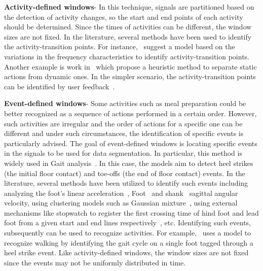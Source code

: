 \noindent\textbf{Activity-defined windows}- In this technique, signals are partitioned based on the detection of activity changes, so the start and end points of each activity should be determined. Since the times of activities can be different, the window sizes are not fixed. In the literature, several methods have been used to identify the activity-transition points. For instance,~\citep{sekine2000classification,nyan2006classification} suggest a model based on the variations in the frequency characteristics to identify activity-transition points.  Another example is work in~\citep{yoshizawa2013parameter} which propose a heuristic method to separate static actions from dynamic ones. In the simpler scenario, the activity-transition points can be identified by user feedback~\citep{lester2006practical,he2009activity,figo2010preprocessing,dernbach2012simple}. 

\noindent\textbf{Event-defined windows}- Some activities such as meal preparation could be better recognized as a sequence of actions performed in a certain order. However, such activities are irregular and the order of actions for a specific one can be different and under such circumstances, the identification of specific events is particularly advised. The goal of event-defined windows is locating specific events in the signals to be used for data segmentation. In particular, this method is widely used in Gait analysis~\citep{banos2014window}. In this case, the models aim to detect heel strikes (the initial floor contact) and toe-offs (the end of floor contact) events. In the literature, several methods have been utilized to identify such events including analyzing the foot's linear acceleration~\citep{aminian1999temporal,selles2005automated}, Foot~\citep{aminian2002spatio} and shank~\citep{jasiewicz2006gait} sagittal angular velocity, using clustering models such as Gaussian mixture~\citep{aung2013automated}, using external mechanisms like stopwatch to register the first crossing time of hind foot and lead foot from a given start and end lines respectively~\citep{dobkin2011reliability}, etc. Identifying such events, subsequently can be used to recognize activities. For example,~\citep{benocci2010wearable} uses a model to recognize walking by identifying the gait cycle on a single foot tagged through a heel strike event. Like activity-defined windows, the window sizes are not fixed since the events may not be uniformly distributed in time.  

